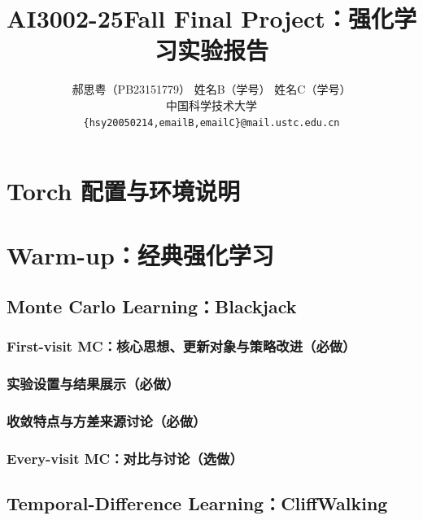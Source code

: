 \documentclass{article}
\title{AI3002-25Fall Final Project：强化学习实验报告}
\author{
  郝思粤（PB23151779） \And 姓名B（学号） \And 姓名C（学号）\\
  中国科学技术大学 \\
  \texttt{\{hsy20050214,emailB,emailC\}@mail.ustc.edu.cn}
}
\begin{document}
\maketitle

\begin{abstract}
\end{abstract}

\section{Torch 配置与环境说明}

\section{Warm-up：经典强化学习}

\subsection{Monte Carlo Learning：Blackjack}
\subsubsection{First-visit MC：核心思想、更新对象与策略改进（必做）}

\subsubsection{实验设置与结果展示（必做）}

\subsubsection{收敛特点与方差来源讨论（必做）}

\subsubsection{Every-visit MC：对比与讨论（选做）}

\subsection{Temporal-Difference Learning：CliffWalking}
\end{document}
